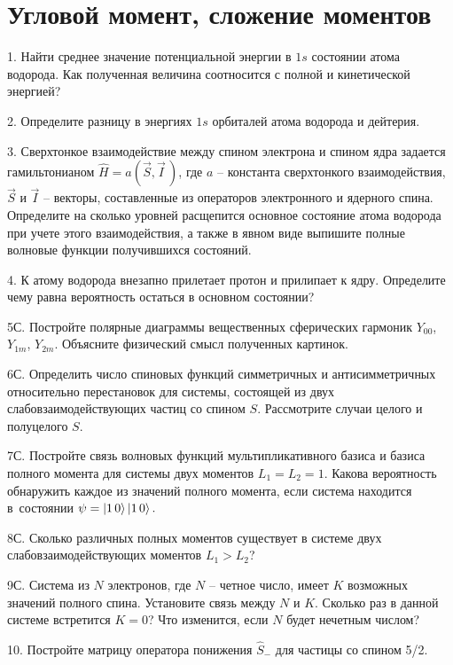 \setmainfont{Noto Serif}
\setsansfont{Noto Sans}
\setmonofont{Noto Sans Mono}
\footnotesize

\section{Угловой момент, сложение моментов}

1. Найти среднее значение потенциальной энергии в $1s$ состоянии атома водорода. Как полученная величина соотносится с полной и кинетической энергией? 
\par
2. Определите разницу в энергиях $1s$ орбиталей атома водорода и дейтерия.
\par
3. Сверхтонкое взаимодействие между спином электрона и спином ядра задается гамильтонианом $\widehat H = a (\vec S, \vec I\,)$, где $a$ – константа сверхтонкого взаимодействия, $\vec S$ и $\vec I$ – векторы, составленные из операторов электронного и ядерного спина. Определите на сколько уровней расщепится основное состояние атома водорода при учете этого взаимодействия, а также в явном виде выпишите полные волновые функции получившихся состояний.
\par
4. К атому водорода внезапно прилетает протон и прилипает к ядру. Определите чему равна вероятность остаться в основном состоянии?
\par
5С. Постройте полярные диаграммы вещественных сферических гармоник $\textit{Y}_{00}$, $\textit{Y}_{1m}$, $\textit{Y}_{2m}$. Объясните физический смысл полученных картинок.
\par
6С. Определить число спиновых функций симметричных и антисимметричных относительно перестановок для системы, состоящей из двух слабовзаимодействующих частиц со спином $S$. Рассмотрите случаи целого и полуцелого $S$.\par
7С. Постройте связь волновых функций мультипликативного базиса и базиса полного момента для системы двух моментов $L_1 = L_2 = 1$. Какова вероятность обнаружить каждое из значений полного момента, если система находится в~состоянии $\psi = \ket{1\,0}\ket{1\,0}.$
\par
8С. Сколько различных полных моментов существует в системе двух слабовзаимодействующих моментов $L_1 > L_2$?
\par
9С. Система из $N$ электронов, где $N$ – четное число, имеет $K$ возможных значений полного спина. Установите связь между $N$ и $K$. Сколько раз в данной системе встретится $K = 0$? Что изменится, если $N$ будет нечетным числом?
\par
10. Постройте матрицу оператора понижения $\widehat{S}_{-}$ для частицы со спином 5/2.
